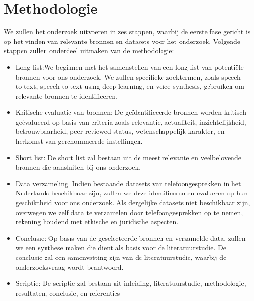 \section{Methodologie}%
\label{sec:methodologie}

We zullen het onderzoek uitvoeren in zes stappen, waarbij de eerste fase gericht is op het vinden van relevante bronnen en datasets voor het onderzoek. Volgende stappen zullen onderdeel uitmaken van de methodologie:

\begin{itemize}
    \item Long list:We beginnen met het samenstellen van een long list van potentiële bronnen voor ons onderzoek. We zullen specifieke zoektermen, zoals speech-to-text, speech-to-text using deep learning, en voice synthesis, gebruiken om relevante bronnen te identificeren.
    \item Kritische evaluatie van bronnen: De geïdentificeerde bronnen worden kritisch geëvalueerd op basis van criteria zoals relevantie, actualiteit, inzichtelijkheid, betrouwbaarheid, peer-reviewed status, wetenschappelijk karakter, en herkomst van gerenommeerde instellingen.
    \item Short list: De short list zal bestaan uit de meest relevante en veelbelovende bronnen die aansluiten bij ons onderzoek.
    \item Data verzameling: Indien bestaande datasets van telefoongesprekken in het Nederlands beschikbaar zijn, zullen we deze identificeren en evalueren op hun geschiktheid voor ons onderzoek. Als dergelijke datasets niet beschikbaar zijn, overwegen we zelf data te verzamelen door telefoongesprekken op te nemen, rekening houdend met ethische en juridische aspecten.
    \item Conclusie: Op basis van de geselecteerde bronnen en verzamelde data, zullen we een synthese maken die dient als basis voor de literatuurstudie. De conclusie zal een samenvatting zijn van de literatuurstudie, waarbij de onderzoeksvraag wordt beantwoord.
    \item Scriptie: De scriptie zal bestaan uit inleiding, literatuurstudie, methodologie, resultaten, conclusie, en referenties
\end{itemize}

